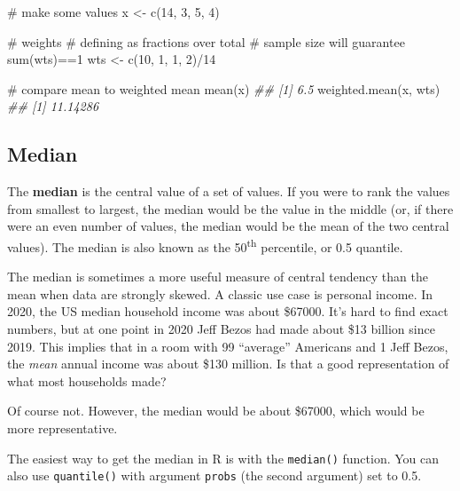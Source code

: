 \documentclass[
  13,
  letterpaper,
]{report}
\newenvironment{Shaded}{\begin{snugshade}}{\end{snugshade}}
\newcommand{\CommentTok}[1]{\textcolor[rgb]{0.37,0.37,0.37}{#1}}
\newcommand{\DecValTok}[1]{\textcolor[rgb]{0.68,0.00,0.00}{#1}}
\newcommand{\DocumentationTok}[1]{\textcolor[rgb]{0.37,0.37,0.37}{\textit{#1}}}
\newcommand{\FunctionTok}[1]{\textcolor[rgb]{0.28,0.35,0.67}{#1}}
\newcommand{\NormalTok}[1]{\textcolor[rgb]{0.00,0.23,0.31}{#1}}
\newcommand{\OtherTok}[1]{\textcolor[rgb]{0.00,0.23,0.31}{#1}}
\newcommand{\SpecialCharTok}[1]{\textcolor[rgb]{0.37,0.37,0.37}{#1}}
\begin{document}
\begin{Shaded}
\begin{Highlighting}[]

\CommentTok{\# make some values}
\NormalTok{x }\OtherTok{\textless{}{-}} \FunctionTok{c}\NormalTok{(}\DecValTok{14}\NormalTok{, }\DecValTok{3}\NormalTok{, }\DecValTok{5}\NormalTok{, }\DecValTok{4}\NormalTok{)}

\CommentTok{\# weights}
\CommentTok{\# defining as fractions over total}
\CommentTok{\# sample size will guarantee sum(wts)==1}
\NormalTok{wts }\OtherTok{\textless{}{-}} \FunctionTok{c}\NormalTok{(}\DecValTok{10}\NormalTok{, }\DecValTok{1}\NormalTok{, }\DecValTok{1}\NormalTok{, }\DecValTok{2}\NormalTok{)}\SpecialCharTok{/}\DecValTok{14}

\CommentTok{\# compare mean to weighted mean}
\FunctionTok{mean}\NormalTok{(x)}
\DocumentationTok{\#\# [1] 6.5}
\FunctionTok{weighted.mean}\NormalTok{(x, wts)}
\DocumentationTok{\#\# [1] 11.14286}
\end{Highlighting}
\end{Shaded}

\subsection{Median}\label{sec-desc-cen-med}

The \textbf{median} is the central value of a set of values. If you were
to rank the values from smallest to largest, the median would be the
value in the middle (or, if there were an even number of values, the
median would be the mean of the two central values). The median is also
known as the 50\textsuperscript{th} percentile, or 0.5 quantile.

The median is sometimes a more useful measure of central tendency than
the mean when data are strongly skewed. A classic use case is personal
income. In 2020, the US median household income was about \$67000. It's
hard to find exact numbers, but at one point in 2020 Jeff Bezos had made
about \$13 billion since 2019. This implies that in a room with 99
``average'' Americans and 1 Jeff Bezos, the \emph{mean} annual income
was about \$130 million. Is that a good representation of what most
households made?

Of course not. However, the median would be about \$67000, which would
be more representative.

The easiest way to get the median in R is with the \texttt{median()}
function. You can also use \texttt{quantile()} with argument
\texttt{probs} (the second argument) set to 0.5.
\end{document}
